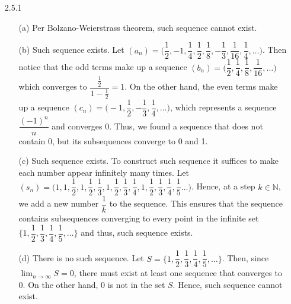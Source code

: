 \documentclass[11pt]{article}
\newcommand{\nats}{\mathbb{N}}
\begin{document}
\begin{itemize}
    \item[2.5.1]
        \begin{itemize}
            \item[(a)]
                Per Bolzano-Weierstrass theorem, such sequence cannot exist.

            \item[(b)]
                Such sequence exists. Let $(a_n) = \Big(\dfrac{1}{2}, -1,
                \dfrac{1}{4}, \dfrac{1}{2}, \dfrac{1}{8}, -\dfrac{1}{3},
                \dfrac{1}{16}, \dfrac{1}{4},\dots\Big)$. Then notice that the
                odd terms make up a sequence $(b_n) = \Big(\dfrac{1}{2},
                \dfrac{1}{4}, \dfrac{1}{8}, \dfrac{1}{16}, \dots\Big)$ which
                converges to $\dfrac{\frac{1}{2}}{1 - \frac{1}{2}} = 1$. On the
                other hand, the even terms make up a sequence $(c_n) = \Big(-1,
                \dfrac{1}{2}, -\dfrac{1}{3}, \dfrac{1}{4}, \dots\Big)$, which
                represents a sequence $\dfrac{(-1)^{n}}{n}$ and converges $0$.
                Thus, we found a sequence that does not contain 0, but its
                subsequences converge to 0 and 1.

            \item[(c)]
                Such sequence exists. To construct such sequence it suffices to
                make each number appear infinitely many times. Let $(s_n) =
                \Big(1, 1, \dfrac{1}{2}, 1, \dfrac{1}{2}, \dfrac{1}{3}, 1,
                \dfrac{1}{2}, \dfrac{1}{3}, \dfrac{1}{4}, 1, \dfrac{1}{2},
                \dfrac{1}{3}, \dfrac{1}{4}, \dfrac{1}{5}\dots\Big)$. Hence, at
                a step $k \in \nats$, we add a new number $\dfrac{1}{k}$ to the
                sequence. This ensures that the sequence contains subsequences
                converging to every point in the infinite set $\{1,
                \dfrac{1}{2}, \dfrac{1}{3}, \dfrac{1}{4}, \dfrac{1}{5},
                \dots\}$ and thus, such sequence exists.

            \item[(d)]
                There is no such sequence. Let $S = \{1, \dfrac{1}{2},
                \dfrac{1}{3}, \dfrac{1}{4}, \dfrac{1}{5}, \dots\}$. Then, since
                $\lim_{n \to \infty} S = 0$, there must exist at least one
                sequence that converges to 0. On the other hand, 0 is not in
                the set $S$. Hence, such sequence cannot exist.
        \end{itemize}


\end{itemize}
\end{document}

